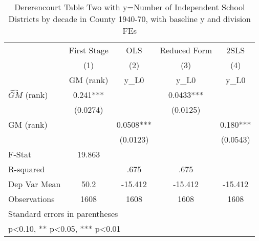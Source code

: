 \begin{table}[htbp]\centering
\def\sym#1{\ifmmode^{#1}\else\(^{#1}\)\fi}
\caption{Dererencourt Table Two with y=Number of Independent School Districts by decade in County 1940-70, with baseline y and division FEs}
\begin{tabular}{l*{4}{c}}
\toprule
                    & First Stage   &         OLS   &Reduced Form   &        2SLS   \\
                    &\multicolumn{1}{c}{(1)}&\multicolumn{1}{c}{(2)}&\multicolumn{1}{c}{(3)}&\multicolumn{1}{c}{(4)}\\
                    &\multicolumn{1}{c}{GM  (rank)}&\multicolumn{1}{c}{y\_L0}&\multicolumn{1}{c}{y\_L0}&\multicolumn{1}{c}{y\_L0}\\
\midrule
$\hat{GM}$ (rank)   &       0.241***&               &      0.0433***&               \\
                    &    (0.0274)   &               &    (0.0125)   &               \\
\addlinespace
GM  (rank)          &               &      0.0508***&               &       0.180***\\
                    &               &    (0.0123)   &               &    (0.0543)   \\
\midrule
F-Stat              &      19.863   &               &               &               \\
R-squared           &               &        .675   &        .675   &               \\
Dep Var Mean        &        50.2   &     -15.412   &     -15.412   &     -15.412   \\
Observations        &        1608   &        1608   &        1608   &        1608   \\
\bottomrule
\multicolumn{5}{l}{\footnotesize Standard errors in parentheses}\\
\multicolumn{5}{l}{\footnotesize * p<0.10, ** p<0.05, *** p<0.01}\\
\end{tabular}
\end{table}

